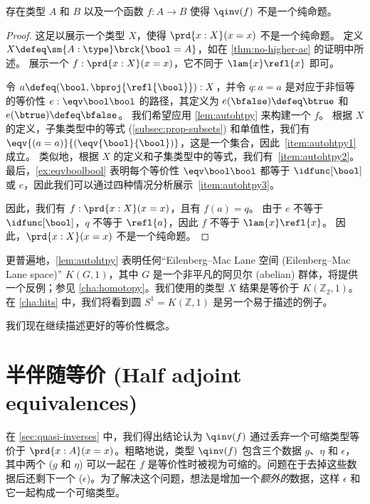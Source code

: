 \begin{thm}\label{thm:qinv-notprop}
存在类型 $A$ 和 $B$ 以及一个函数 $f:A\to B$ 使得 $\qinv(f)$ 不是一个纯命题。
\end{thm}
\begin{proof}
  这足以展示一个类型 $X$，使得 $\prd{x:X} (x=x)$ 不是一个纯命题。
  定义 $X\defeq \sm{A:\type} \brck{\bool=A}$，如在 \cref{thm:no-higher-ac} 的证明中所述。
  展示一个 $f:\prd{x:X} (x=x)$，它不同于 $\lam{x} \refl{x}$ 即可。

  令 $a \defeq (\bool,\bproj{\refl{\bool}}) : X$，并令 $q:a=a$ 是对应于非恒等的等价性 $e:\eqv\bool\bool$ 的路径，其定义为 $e(\bfalse)\defeq\btrue$ 和 $e(\btrue)\defeq\bfalse$。
  我们希望应用 \cref{lem:autohtpy} 来构建一个 $f$。
  根据 $X$ 的定义，子集类型中的等式 (\cref{subsec:prop-subsets}) 和单值性，我们有 $\eqv{(a=a)}{(\eqv{\bool}{\bool})}$，这是一个集合，因此~\ref{item:autohtpy1} 成立。
  类似地，根据 $X$ 的定义和子集类型中的等式，我们有~\ref{item:autohtpy2}。
  最后，\cref{ex:eqvboolbool} 表明每个等价性 $\eqv\bool\bool$ 都等于 $\idfunc[\bool]$ 或 $e$，因此我们可以通过四种情况分析展示~\ref{item:autohtpy3}。

  因此，我们有 $f:\prd{x:X} (x=x)$，且有 $f(a) = q$。
  由于 $e$ 不等于 $\idfunc[\bool]$，$q$ 不等于 $\refl{a}$，因此 $f$ 不等于 $\lam{x} \refl{x}$。
  因此，$\prd{x:X} (x=x)$ 不是一个纯命题。
\end{proof}

更普遍地，\cref{lem:autohtpy} 表明任何“Eilenberg--Mac Lane 空间 (Eilenberg--Mac Lane space)” $K(G,1)$，其中 $G$ 是一个非平凡的阿贝尔 (abelian) 群体，将提供一个反例；参见 \cref{cha:homotopy}。我们使用的类型 $X$ 结果是等价于 $K(\mathbb{Z}_2,1)$。在 \cref{cha:hits} 中，我们将看到圆 $S^1 = K(\mathbb{Z},1)$ 是另一个易于描述的例子。

我们现在继续描述更好的等价性概念。

%

\section{半伴随等价 (Half adjoint equivalences)}
\label{sec:hae}

%
%
%

在 \cref{sec:quasi-inverses} 中，我们得出结论认为 $\qinv(f)$ 通过丢弃一个可缩类型等价于 $\prd{x:A} (x=x)$。粗略地说，类型 $\qinv(f)$ 包含三个数据 $g$、$\eta$ 和 $\epsilon$，其中两个 ($g$ 和 $\eta$) 可以一起在 $f$ 是等价性时被视为可缩的。问题在于去掉这些数据后还剩下一个 ($\epsilon$)。为了解决这个问题，想法是增加一个\emph{额外的}数据，这样 $\epsilon$ 和它一起构成一个可缩类型。

